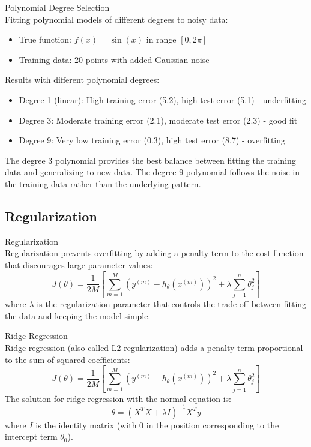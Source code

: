 \begin{example2}{Polynomial Degree Selection}\\
Fitting polynomial models of different degrees to noisy data:
\begin{itemize}
    \item True function: $f(x) = \sin(x)$ in range $[0, 2\pi]$
    \item Training data: 20 points with added Gaussian noise
\end{itemize}
\tcblower
Results with different polynomial degrees:
\begin{itemize}
    \item Degree 1 (linear): High training error (5.2), high test error (5.1) - underfitting
    \item Degree 3: Moderate training error (2.1), moderate test error (2.3) - good fit
    \item Degree 9: Very low training error (0.3), high test error (8.7) - overfitting
\end{itemize}

The degree 3 polynomial provides the best balance between fitting the training data and generalizing to new data. The degree 9 polynomial follows the noise in the training data rather than the underlying pattern.
\end{example2}

\subsection{Regularization}

\begin{concept}{Regularization}\\
Regularization prevents overfitting by adding a penalty term to the cost function that discourages large parameter values:
\[J(\theta) = \frac{1}{2M}[\sum_{m=1}^{M}(y^{(m)} - h_\theta(x^{(m)}))^2 + \lambda\sum_{j=1}^{n}\theta_j^2]\]
where $\lambda$ is the regularization parameter that controls the trade-off between fitting the data and keeping the model simple.
\end{concept}

\begin{definition}{Ridge Regression}\\
Ridge regression (also called L2 regularization) adds a penalty term proportional to the sum of squared coefficients:
\[J(\theta) = \frac{1}{2M}[\sum_{m=1}^{M}(y^{(m)} - h_\theta(x^{(m)}))^2 + \lambda\sum_{j=1}^{n}\theta_j^2]\]
The solution for ridge regression with the normal equation is:
\[\theta = (X^T X + \lambda I)^{-1}X^T y\]
where $I$ is the identity matrix (with 0 in the position corresponding to the intercept term $\theta_0$).
\end{definition}

